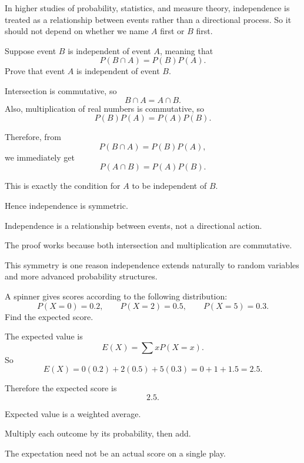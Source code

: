 \begin{problem}
In higher studies of probability, statistics, and measure theory, independence is treated as a relationship between events rather than a directional process. So it should not depend on whether we name $A$ first or $B$ first.

Suppose event $B$ is independent of event $A$, meaning that
\[
P(B\cap A)=P(B)P(A).
\]
Prove that event $A$ is independent of event $B$.
\end{problem}

\begin{solution}
Intersection is commutative, so
\[
B\cap A=A\cap B.
\]
Also, multiplication of real numbers is commutative, so
\[
P(B)P(A)=P(A)P(B).
\]

Therefore, from
\[
P(B\cap A)=P(B)P(A),
\]
we immediately get
\[
P(A\cap B)=P(A)P(B).
\]

This is exactly the condition for $A$ to be independent of $B$.

Hence independence is symmetric.
\end{solution}

\begin{takeaways}
\item Independence is a relationship between events, not a directional action.
\item The proof works because both intersection and multiplication are commutative.
\item This symmetry is one reason independence extends naturally to random variables and more advanced probability structures.
\end{takeaways}

\begin{problem}
A spinner gives scores according to the following distribution:
\[
P(X=0)=0.2,\qquad P(X=2)=0.5,\qquad P(X=5)=0.3.
\]
Find the expected score.
\end{problem}

\begin{solution}
The expected value is
\[
E(X)=\sum xP(X=x).
\]
So
\[
E(X)=0(0.2)+2(0.5)+5(0.3)=0+1+1.5=2.5.
\]

Therefore the expected score is
\[
\boxed{2.5}.
\]
\end{solution}

\begin{takeaways}
\item Expected value is a weighted average.
\item Multiply each outcome by its probability, then add.
\item The expectation need not be an actual score on a single play.
\end{takeaways}


